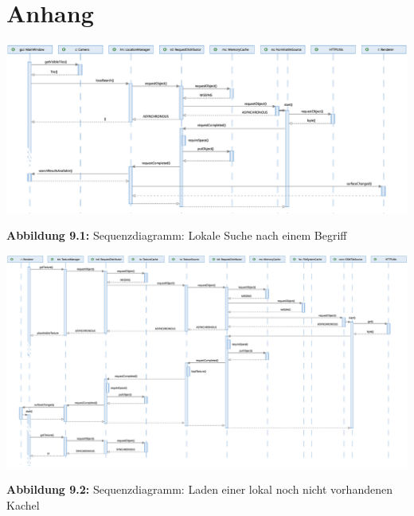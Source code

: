 \documentclass[10pt]{scrreprt}
\begin{document}
\newpage
\pagestyle{empty}


\chapter{Anhang}
\centering
\thispagestyle{empty}
\includegraphics[scale=0.45,angle=90,origin=c]{sequenz-search.eps}
\hspace{5mm}
\begin{rotate}{90}
\textbf{Abbildung 9.1:} Sequenzdiagramm: Lokale Suche nach einem Begriff
\end{rotate}

\newpage
{}
\thispagestyle{empty}
\includegraphics[scale=0.45,angle=90,origin=c]{sequenz-osmtile.eps}
\hspace{5mm}
\begin{rotate}{90}
\textbf{Abbildung 9.2:} Sequenzdiagramm: Laden einer lokal noch nicht vorhandenen Kachel
\end{rotate}
\end{document}
